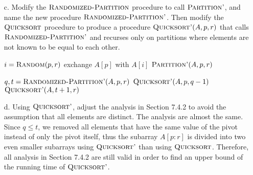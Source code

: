 \documentclass[12pt,reqno]{amsart}
\newif\ifanswer
\begin{document}
\begin{enumerate}[1.]
\begin{enumerate}
    \item[c.] Modify the $\textsc{Randomized-Partition}$ procedure to call $\textsc{Partition'}$, and name the new procedure $\textsc{Randomized-Partition'}$. Then modify the $\textsc{Quicksort}$ procedure to produce a procedure $\textsc{Quicksort'}(A, p, r)$ that calls $\textsc{Randomized-Partition'}$ and recurses only on partitions where elements are not known to be equal to each other.
    \ifanswer
    \noindent {\bf \\Solution}
    \begin{algorithm}
        \caption{$\textsc{Randomized-Partition'}(A, p, r)$}
        \begin{algorithmic}[1]
            \STATE $i = \textsc{Random}(p, r)$
            \STATE exchange $A[p]$ with $A[i]$
            \RETURN $\textsc{Partition'}(A, p, r)$
        \end{algorithmic}
    \end{algorithm}
    \begin{algorithm}
        \caption{$\textsc{Quicksort'}(A, p, r)$}
        \begin{algorithmic}[1]
                \STATE $q, t = \textsc{Randomized-Partition'}(A, p, r)$
                \STATE $\textsc{Quicksort'}(A, p, q - 1)$
                \STATE $\textsc{Quicksort'}(A, t + 1, r)$
            \ENDIF
        \end{algorithmic}
    \end{algorithm}
    
    \item[d.] Using $\textsc{Quicksort'}$, adjust the analysis in Section 7.4.2 to avoid the assumption that all elements are distinct.
    \ifanswer
    \noindent {\bf \\Solution}
    The analysis are almost the same. Since $q \leq t$, we removed all elements that have the same value of the pivot instead of only the pivot itself, thus the subarray $A[p: r]$ is divided into two even smaller subarrays using $\textsc{Quicksort'}$ than using $\textsc{Quicksort}$. Therefore, all analysis in Section 7.4.2 are still valid in order to find an upper bound of the running time of $\textsc{Quicksort'}$.
\end{enumerate}
\vspace{1cm}




\end{enumerate}
\end{document}
